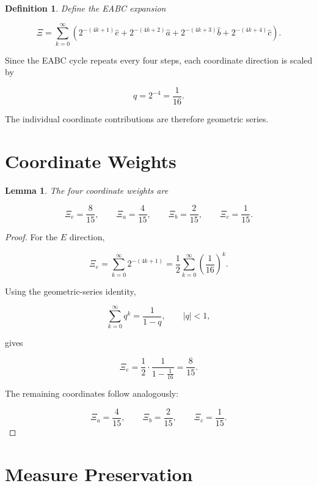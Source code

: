 \documentclass[11pt]{article}
\newtheorem{lemma}{Lemma}
\newtheorem{definition}{Definition}
\begin{document}
	\begin{definition}
		
		Define the EABC expansion
		
		\[
		\Xi
		=
		\sum_{k=0}^{\infty}
		\left(
		2^{-(4k+1)}\hat e
		+
		2^{-(4k+2)}\hat a
		+
		2^{-(4k+3)}\hat b
		+
		2^{-(4k+4)}\hat c
		\right).
		\]
		
	\end{definition}
	
	Since the EABC cycle repeats every four steps,
	each coordinate direction is scaled by
	
	\[
	q=2^{-4}=\frac1{16}.
	\]
	
	The individual coordinate contributions are therefore geometric series.
	
	\section{Coordinate Weights}
	
	\begin{lemma}
		
		The four coordinate weights are
		
		\[
		\Xi_e=\frac{8}{15},
		\qquad
		\Xi_a=\frac{4}{15},
		\qquad
		\Xi_b=\frac{2}{15},
		\qquad
		\Xi_c=\frac{1}{15}.
		\]
		
	\end{lemma}
	
	\begin{proof}
		
		For the $E$ direction,
		
		\[
		\Xi_e
		=
		\sum_{k=0}^{\infty}
		2^{-(4k+1)}
		=
		\frac12
		\sum_{k=0}^{\infty}
		\left(\frac1{16}\right)^k.
		\]
		
		Using the geometric-series identity,
		
		\[
		\sum_{k=0}^{\infty}q^k
		=
		\frac1{1-q},
		\qquad |q|<1,
		\]
		
		gives
		
		\[
		\Xi_e
		=
		\frac12
		\cdot
		\frac1{1-\frac1{16}}
		=
		\frac8{15}.
		\]
		
		The remaining coordinates follow analogously:
		
		\[
		\Xi_a=\frac4{15},
		\qquad
		\Xi_b=\frac2{15},
		\qquad
		\Xi_c=\frac1{15}.
		\]
		
	\end{proof}
	
	\section{Measure Preservation}
	
\end{document}
